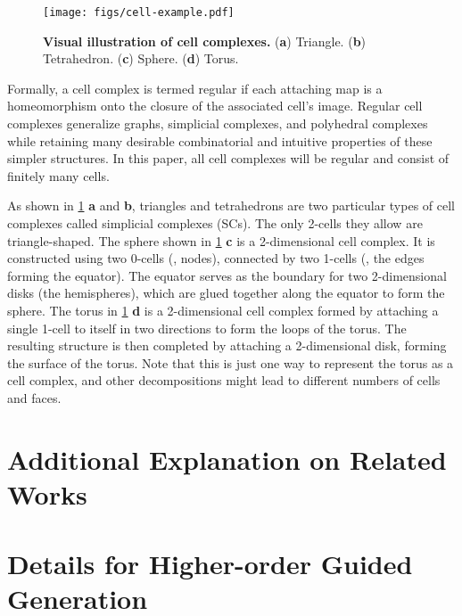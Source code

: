 \begin{figure}[!t]
\centering
\texttt{[image: figs/cell-example.pdf]}
\vspace{-3mm}
\caption{\textbf{Visual illustration of cell complexes.} (\textbf{a}) Triangle. (\textbf{b}) Tetrahedron. (\textbf{c}) Sphere. (\textbf{d}) Torus.}
\label{fig:cell-example}
\vspace{-4mm}
\end{figure}


Formally, a cell complex is termed regular if each attaching map is a homeomorphism onto the closure of the associated cell’s image. 
Regular cell complexes generalize graphs, simplicial complexes, and polyhedral complexes while retaining many desirable combinatorial and intuitive properties of these simpler structures.
In this paper, all cell complexes will be regular and consist of finitely many cells. 

As shown in \cref{fig:cell-example} \textbf{a} and \textbf{b},
triangles and tetrahedrons are two particular types of cell complexes called simplicial complexes (SCs). The only 2-cells they allow are triangle-shaped.
%
The sphere shown in \cref{fig:cell-example} \textbf{c} is a 2-dimensional cell complex. It is constructed using two 0-cells (\ie, nodes), connected by two 1-cells (\ie, the edges forming the equator). The equator serves as the boundary for two 2-dimensional disks (the hemispheres), which are glued together along the equator to form the sphere.
The torus in \cref{fig:cell-example} \textbf{d} is a 2-dimensional cell complex formed by attaching a single 1-cell to itself in two directions to form the loops of the torus. The resulting structure is then completed by attaching a 2-dimensional disk, forming the surface of the torus.
Note that this is just one way to represent the torus as a cell complex, and other decompositions might lead to different numbers of cells and faces.



\section{Additional Explanation on Related Works}
\label{app:related}



\section{Details for Higher-order Guided Generation }
\label{app:detail-HOG-Diff}

